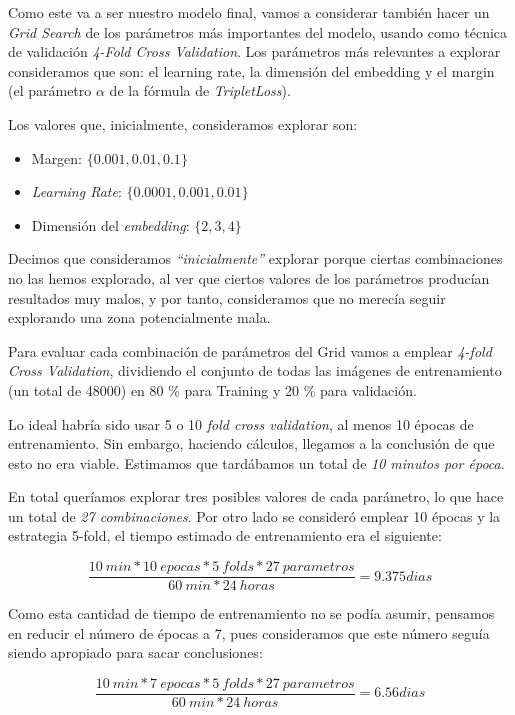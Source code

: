\documentclass[11pt]{article}
\newcommand{\entrecomillado}[1]{\emph{``#1''}}
\begin{document}
Como este va a ser nuestro modelo final, vamos a considerar también hacer un \emph{Grid Search} de los parámetros más importantes del modelo, usando como técnica de validación \emph{4-Fold Cross Validation}. Los parámetros más relevantes a explorar consideramos que son: el learning rate, la dimensión del embedding y el margin (el parámetro $\alpha$ de la fórmula de \emph{TripletLoss}). 

Los valores que, inicialmente, consideramos explorar son:

\begin{itemize}
  \item Margen: $\{0.001, 0.01, 0.1\}$
  \item \emph{Learning Rate}: $\{0.0001, 0.001, 0.01\}$
  \item Dimensión del \emph{embedding}: $\{2, 3, 4\}$
\end{itemize}

Decimos que consideramos \entrecomillado{inicialmente} explorar porque ciertas combinaciones no las hemos explorado, al ver que ciertos valores de los parámetros producían resultados muy malos, y por tanto, consideramos que no merecía seguir explorando una zona potencialmente mala.

Para evaluar cada combinación de parámetros del Grid vamos a emplear \emph{4-fold Cross Validation}, dividiendo el conjunto de todas las imágenes de entrenamiento (un total de 48000) en 80 \% para Training y 20 \% para validación.

Lo ideal habría sido usar 5 o 10 \emph{fold cross validation}, al menos 10 épocas de entrenamiento. Sin embargo, haciendo cálculos, llegamos a la conclusión de que esto no era viable. Estimamos que tardábamos  un total de \emph{10 minutos por época}. 

En total queríamos explorar tres posibles valores de cada parámetro, lo que hace un total de \emph{27 combinaciones}. Por otro lado se consideró emplear 10 épocas y la estrategia 5-fold, el tiempo estimado de entrenamiento era el siguiente:   

$$\frac{10 \:  min * 10 \: epocas * 5 \: folds * 27 \: parametros}{60 \: min * 24 \: horas} = 9.375 dias$$

Como esta cantidad de tiempo de entrenamiento no se podía asumir, pensamos en reducir el número de épocas a 7, pues consideramos que este número seguía siendo apropiado para sacar conclusiones:

$$\frac{10 \:  min * 7 \: epocas * 5 \: folds * 27 \: parametros}{60 \: min * 24 \: horas} = 6.56 dias$$
\end{document}
